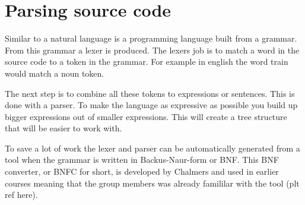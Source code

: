 \section{Parsing source code} \label{sec:bnfc}


Similar to a natural language is a programming language built from a grammar. 
From this grammar a lexer is produced. The lexers job is to match a word in the
source code to a token in the grammar. For example in english the word train 
would match a noun token. 

The next step is to combine all these tokens to expressions or sentences. This
is done with a parser. To make the language as expressive as possible you build
up bigger expressions out of smaller expressions. This will create a tree
structure that will be easier to work with. 

To save a lot of work the lexer and parser can be automatically generated from
a tool when the grammar is written in Backus-Naur-form or BNF. This BNF converter, or
BNFC for short, is developed by Chalmers and used in earlier courses meaning that
the group members was already famililar with the tool (plt ref here).


